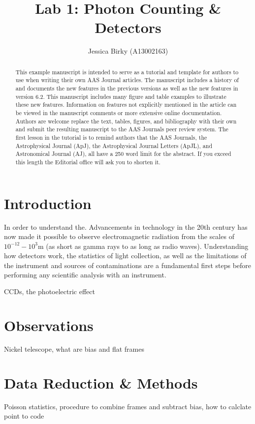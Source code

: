 \documentclass[onecolumn]{aastex62}
\begin{document}
\title{\sc Lab 1: Photon Counting \& Detectors}

\author{Jessica Birky (A13002163)}

\begin{abstract}

This example manuscript is intended to serve as a tutorial and template for
authors to use when writing their own AAS Journal articles. The manuscript
includes a history of and documents the new features in the
previous versions as well as the new features in version 6.2. This
manuscript includes many figure and table examples to illustrate these new
features.  Information on features not explicitly mentioned in the article
can be viewed in the manuscript comments or more extensive online
documentation. Authors are welcome replace the text, tables, figures, and
bibliography with their own and submit the resulting manuscript to the AAS
Journals peer review system.  The first lesson in the tutorial is to remind
authors that the AAS Journals, the Astrophysical Journal (ApJ), the
Astrophysical Journal Letters (ApJL), and Astronomical Journal (AJ), all
have a 250 word limit for the abstract.  If you exceed this length the
Editorial office will ask you to shorten it.

\end{abstract}
\bigskip

\section{Introduction} 
In order to understand the. Advancements in technology in the 20th century has now made it possible to observe electromagnetic radiation from the scales of $10^{-12}-10^3$m (as short as gamma rays to as long as radio waves). Understanding how detectors work, the statistics of light collection, as well as the limitations of the instrument and sources of contaminations are a fundamental first steps before performing any scientific analysis with an instrument.

CCDs, the photoelectric effect

\section{Observations}
Nickel telescope, what are bias and flat frames


\section{Data Reduction \& Methods}
Poisson statistics, procedure to combine frames and subtract bias, how to calclate  point to code
\end{document}
